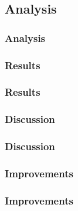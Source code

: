 \subsection{Analysis}
\begin{frame}
\frametitle{Analysis}
\end{frame}

\subsubsection{Results}
\begin{frame}
\frametitle{Results}
\end{frame}

\subsubsection{Discussion}
\begin{frame}
\frametitle{Discussion}
\end{frame}

\subsubsection{Improvements}
\begin{frame}
\frametitle{Improvements}
\end{frame}

\begin{frame}
\frametitle{}
\end{frame}

